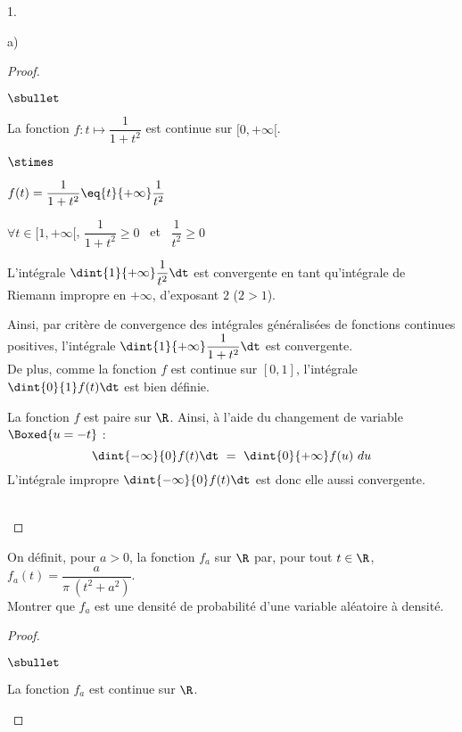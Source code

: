 \documentclass[11pt]{article}%
\begin{document}
\begin{noliste}{1.}
\begin{noliste}{a)}
\begin{proof}
\begin{noliste}{$\sbullet$}
      \item La fonction $f : t \mapsto \dfrac{1}{1 + t^2}$ est
        continue sur $[0, +\infty[$.
        \begin{noliste}{$\stimes$}
        \item $f(t) = \dfrac{1}{1 + t^2} \eq{t}{+\infty}
          \dfrac{1}{t^2}$

        \item $\forall t \in [1, +\infty[$, $\dfrac{1}{1 + t^2} \geq
          0$ \ et \ $\dfrac{1}{t^2} \geq 0$

        \item L'intégrale $\dint{1}{+\infty} \dfrac{1}{t^2} \dt$ est
          convergente en tant qu'intégrale de Riemann impropre en
          $+\infty$, d'exposant $2$ ($2 > 1$).          
        \end{noliste}
        Ainsi, par critère de convergence des intégrales généralisées
        de fonctions continues positives, l'intégrale
        $\dint{1}{+\infty} \dfrac{1}{1+t^2} \dt$ est convergente.\\
        De plus, comme la fonction $f$ est continue sur $[0, 1]$,
        l'intégrale $\dint{0}{1} f(t) \dt$ est bien définie.%

      \item La fonction $f$ est paire sur $\R$. Ainsi, à l'aide du
        changement de variable $\Boxed{u = -t}$ :
        \[
        \dint{-\infty}{0} f(t) \dt \ = \ \dint{0}{+\infty} f(u) \ du
        \]
        L'intégrale impropre $\dint{-\infty}{0} f(t) \dt$ est donc
        elle aussi convergente.
      \end{noliste}
      ~\\[-1cm]
    \end{proof}
    
    
    \newpage
    
    

  \item On définit, pour $a > 0$, la fonction $f_a$ sur $\R$ par, pour
    tout $t \in \R$, $f_a(t) = \dfrac{a}{\pi \ (t^2+a^2)}$.\\
    Montrer que $f_a$ est une densité de probabilité d'une variable
    aléatoire à densité.

    \begin{proof}~%
      \begin{noliste}{$\sbullet$}
      \item La fonction $f_a$ est continue sur $\R$.


\end{noliste}
\end{proof}
\end{noliste}
\end{noliste}
\end{document}
